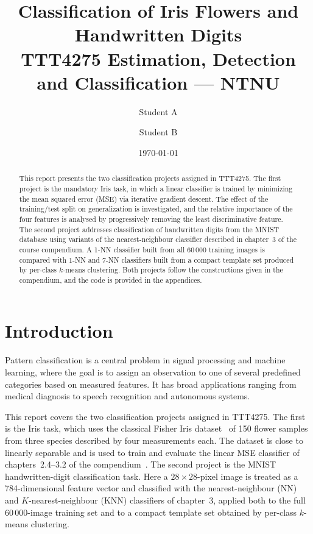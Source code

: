 \documentclass[11pt,a4paper]{article}
\title{Classification of Iris Flowers and Handwritten Digits \\[0.5em]
\large TTT4275 Estimation, Detection and Classification --- NTNU}
\author{Student A \and Student B}
\date{\today}
\begin{document}
\maketitle

\begin{abstract}
This report presents the two classification projects assigned in TTT4275. The first project is the mandatory Iris task, in which a linear classifier is trained by minimizing the mean squared error (MSE) via iterative gradient descent. The effect of the training/test split on generalization is investigated, and the relative importance of the four features is analysed by progressively removing the least discriminative feature. The second project addresses classification of handwritten digits from the MNIST database using variants of the nearest-neighbour classifier described in chapter~3 of the course compendium. A 1-NN classifier built from all 60\,000 training images is compared with 1-NN and 7-NN classifiers built from a compact template set produced by per-class $k$-means clustering. Both projects follow the constructions given in the compendium, and the code is provided in the appendices.
\end{abstract}

\tableofcontents
\newpage

\section{Introduction}

Pattern classification is a central problem in signal processing and machine learning, where the goal is to assign an observation to one of several predefined categories based on measured features. It has broad applications ranging from medical diagnosis to speech recognition and autonomous systems.

This report covers the two classification projects assigned in TTT4275. The first is the Iris task, which uses the classical Fisher Iris dataset~\cite{fisher1936} of 150 flower samples from three species described by four measurements each. The dataset is close to linearly separable and is used to train and evaluate the linear MSE classifier of chapters~2.4--3.2 of the compendium~\cite{compendium}. The second project is the MNIST handwritten-digit classification task. Here a $28\!\times\!28$-pixel image is treated as a 784-dimensional feature vector and classified with the nearest-neighbour (NN) and $K$-nearest-neighbour (KNN) classifiers of chapter~3, applied both to the full 60\,000-image training set and to a compact template set obtained by per-class $k$-means clustering.
\end{document}
